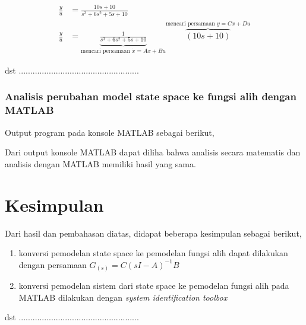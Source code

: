 \documentclass[../main.tex]{subfiles}
\begin{document}
                \begin{equation}
                	\begin{split}
                		\frac{y}{u} &= \frac{10s+10}{s^3+6s^2+5s+10} \\[5pt]
                		\frac{y}{u} &= \underbrace{\frac{1}{s^3+6s^2+5s+10}}_\text{mencari persamaan $\dot{x}=Ax+Bu$} \overbrace{(10s+10)}^\text{mencari persamaan $y=Cx+Du$}
                	\end{split}
               \end{equation}
                
                dst ....................................................
                
                
   		\subsubsection{Analisis perubahan model state space ke fungsi alih dengan MATLAB}
                
            Output program pada konsole MATLAB sebagai berikut,
                
            Dari output konsole MATLAB dapat diliha bahwa analisis secara matematis dan analisis dengan MATLAB memiliki hasil yang sama.
            
            
    \section{Kesimpulan}
        Dari hasil dan pembahasan diatas, didapat beberapa kesimpulan sebagai berikut,
        \begin{enumerate}
            \item konversi pemodelan state space ke pemodelan fungsi alih dapat dilakukan dengan persamaan $G_{(s)} = C(sI - A)^{-1} B$
            \item konversi pemodelan sistem dari state space ke pemodelan fungsi alih pada MATLAB dilakukan dengan \textit{system identification toolbox}
        \end{enumerate}
        
        dst ....................................................
        
        
        
           
    
\end{document}
